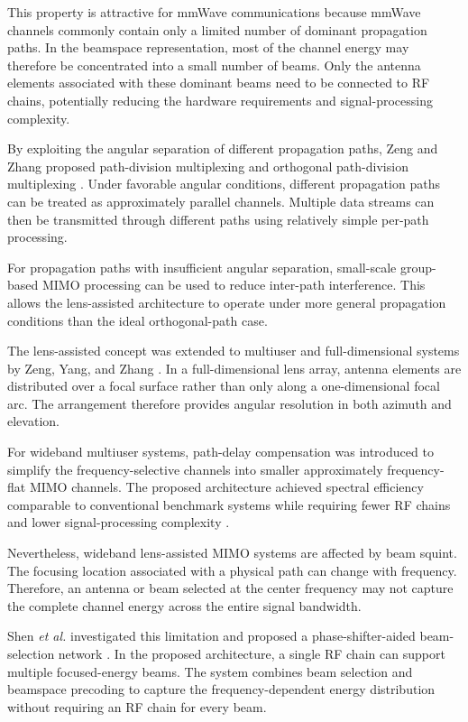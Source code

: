 This property is attractive for mmWave communications because mmWave
channels commonly contain only a limited number of dominant
propagation paths. In the beamspace representation, most of the
channel energy may therefore be concentrated into a small number of
beams. Only the antenna elements associated with these dominant beams
need to be connected to RF chains, potentially reducing the hardware
requirements and signal-processing complexity.

By exploiting the angular separation of different propagation paths,
Zeng and Zhang proposed path-division multiplexing and orthogonal
path-division multiplexing \cite{Zeng2016}. Under favorable
angular conditions, different propagation paths can be treated as
approximately parallel channels. Multiple data streams can then be
transmitted through different paths using relatively simple per-path
processing.

For propagation paths with insufficient angular separation,
small-scale group-based MIMO processing can be used to reduce
inter-path interference. This allows the lens-assisted architecture to
operate under more general propagation conditions than the ideal
orthogonal-path case.

The lens-assisted concept was extended to multiuser and
full-dimensional systems by Zeng, Yang, and Zhang
\cite{Zeng2018}. In a full-dimensional lens array, antenna
elements are distributed over a focal surface rather than only along
a one-dimensional focal arc. The arrangement therefore provides
angular resolution in both azimuth and elevation.

For wideband multiuser systems, path-delay compensation was introduced
to simplify the frequency-selective channels into smaller
approximately frequency-flat MIMO channels. The proposed architecture
achieved spectral efficiency comparable to conventional benchmark
systems while requiring fewer RF chains and lower signal-processing
complexity \cite{Zeng2018}.

Nevertheless, wideband lens-assisted MIMO systems are affected by beam
squint. The focusing location associated with a physical path can
change with frequency. Therefore, an antenna or beam selected at the
center frequency may not capture the complete channel energy across
the entire signal bandwidth.

Shen \textit{et al.} investigated this limitation and proposed a
phase-shifter-aided beam-selection network
\cite{Shen2019}. In the proposed architecture, a single RF
chain can support multiple focused-energy beams. The system combines
beam selection and beamspace precoding to capture the
frequency-dependent energy distribution without requiring an RF
chain for every beam.

